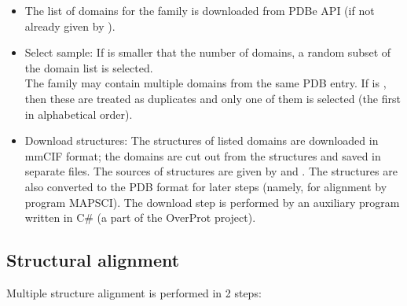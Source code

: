 \documentclass{article}
\begin{document}
\begin{itemize}
  \item
    The list of domains for the family is downloaded from PDBe API
    (if not already given by ).
  \item
    Select sample: If  is smaller that the number of domains, 
    a random subset of the domain list is selected.\\
    The family may contain multiple domains from the same PDB entry. If 
     is , 
    then these are treated as duplicates and only one of them is selected 
    (the first in alphabetical order).
  \item
    Download structures: The structures of listed domains are downloaded
    in mmCIF format; the domains are cut out from the structures and saved in
    separate files. The sources of structures are given by
     and
    . The structures are also converted 
    to the PDB format for later steps (namely, for alignment by program MAPSCI). 
    The download step is performed by an auxiliary program  
    written in C\# (a part of the OverProt project).
  \end{itemize}
  


\subsection{Structural alignment}

Multiple structure alignment is performed in 2 steps:
\end{document}
